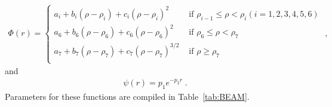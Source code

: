 \documentclass[jcp,amsmath,amssymb,preprint]{revtex4-1}
\begin{document}

\begin{eqnarray}
    \Phi(r) = \left\{
    \begin{array}{cc}
        a_i + b_i \left( \rho - \rho_{i} \right) + c_i \left( \rho - \rho_{i} \right)^{2} & \text{ if } \rho_{i-1} \leq \rho < \rho_{i} (i=1,2,3,4,5,6) \\
        a_6 + b_6 \left( \rho - \rho_{6} \right) + c_6 \left( \rho - \rho_{6} \right)^{2} & \text{ if } \rho_6 \leq \rho < \rho_{7} \\
        a_7 + b_7 \left( \rho - \rho_{7} \right) + c_7 \left( \rho - \rho_{7} \right)^{3/2} & \text{ if } \rho \geq \rho_7 \\
    \end{array}\right. \;, 
\end{eqnarray}
and
\begin{eqnarray}
    \psi(r) = p_1 e^{-p_2 r} \;.
\end{eqnarray}
Parameters for these functions are compiled in Table~\ref{tab:BEAM}. 
\end{document}
